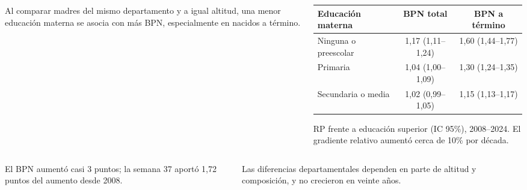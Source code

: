 \documentclass[final]{beamer}
\begin{document}
\begin{frame}[t]
\begin{resultbox}[arc=2.5mm,left=6mm,right=6mm,top=3mm,bottom=3mm]
\begin{columns}[t,totalwidth=\linewidth]
\begin{column}{0.34\linewidth}
\begin{minipage}[t]{\linewidth}\vspace{0pt}
\RaggedRight{} Al comparar madres del mismo departamento y a igual altitud, una menor educación materna se asocia con más BPN, especialmente en nacidos a término.
\end{minipage}
\end{column}
\begin{column}{0.63\linewidth}
\begin{minipage}[t]{\linewidth}\vspace{0pt}
\centering
\begin{tabular*}{0.98\linewidth}{@{\extracolsep{\fill}}lcc@{}}
\toprule
Educación materna & BPN total & BPN a término \\
\midrule
Ninguna o preescolar & 1,17 (1,11–1,24) & 1,60 (1,44–1,77) \\
Primaria & 1,04 (1,00–1,09) & 1,30 (1,24–1,35) \\
Secundaria o media & 1,02 (0,99–1,05) & 1,15 (1,13–1,17) \\
\bottomrule
\end{tabular*}
\par\vspace{2mm}
\RaggedRight\small RP frente a educación superior (IC 95\%), 2008–2024. El gradiente relativo aumentó cerca de 10\% por década.
\end{minipage}
\end{column}
\end{columns}
\end{resultbox}
\vspace{-0.1cm}
\begin{tcolorbox}[colback=headerblue,colframe=headerblue,boxrule=0pt,arc=2.5mm,left=11mm,right=11mm,top=3mm,bottom=2mm]
\color{white}\par\vspace{0.1cm}
\begin{columns}[t,totalwidth=\linewidth]
\begin{column}{0.23\linewidth}
El BPN aumentó casi 3 puntos; la semana 37 aportó 1,72 puntos del aumento desde 2008.
\end{column}
\begin{column}{0.23\linewidth}
Las diferencias departamentales dependen en parte de altitud y composición, y no crecieron en veinte años.
\end{column}
\begin{column}{0.23\linewidth}

\end{column}
\end{columns}
\end{tcolorbox}
\end{frame}
\end{document}
